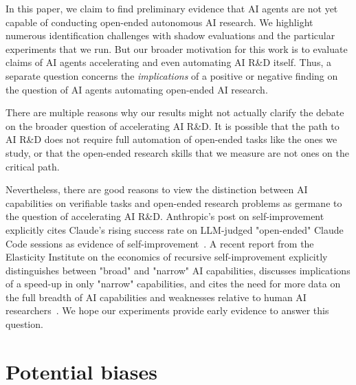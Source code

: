 In this paper, we claim to find preliminary evidence that AI agents are not yet capable of conducting open-ended autonomous AI research. We highlight numerous identification challenges with shadow evaluations and the particular experiments that we run. But our broader motivation for this work is to evaluate claims of AI agents accelerating and even automating AI R\&D itself. Thus, a separate question concerns the \textit{implications} of a positive or negative finding on the question of AI agents automating open-ended AI research. 

There are multiple reasons why our results might not actually clarify the debate on the broader question of accelerating AI R\&D. It is possible that the path to AI R\&D does not require full automation of open-ended tasks like the ones we study, or that the open-ended research skills that we measure are not ones on the critical path. 

Nevertheless, there are good reasons to view the distinction between AI capabilities on verifiable tasks and open-ended research problems as germane to the question of accelerating AI R\&D. Anthropic's post on self-improvement explicitly cites Claude's rising success rate on LLM-judged "open-ended" Claude Code sessions as evidence of self-improvement~\citep{whenaibuildsitself}. A recent report from the Elasticity Institute on the economics of recursive self-improvement explicitly distinguishes between "broad" and "narrow" AI capabilities, discusses implications of a speed-up in only "narrow" capabilities, and cites the need for more data on the full breadth of AI capabilities and weaknesses relative to human AI researchers~\citep{cunningham2026rsi}. We hope our experiments provide early evidence to answer this question. 

\section{Potential biases}
\label{sec:biases}

